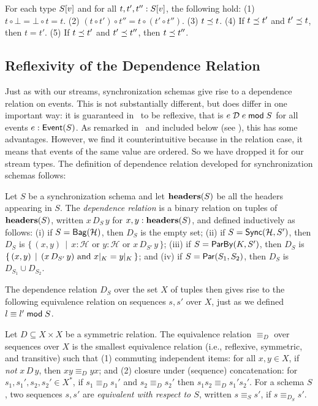 \begin{proposition}
\label{45:prop:sps-concat-properties}
For each type $\spstype{v}{S}$ and for all $t, t', t'': \spstype{v}{S}$,
the following hold:
(1) $t \circ \bot = \bot \circ t = t$.
(2) $(t \circ t') \circ t'' = t \circ (t' \circ t'')$.
(3) $t \prefix t$.
(4) If $t \prefix t'$ and $t' \prefix t$, then $t = t'$.
(5) If $t \prefix t'$ and $t' \prefix t''$, then $t \prefix t''$.
\end{proposition}

\subsection{Reflexivity of the Dependence Relation}

Just as with our streams, synchronization schemas give rise to a dependence relation on events.
This is not substantially different, but does differ in one important way: it is guaranteed in~ to be reflexive, that is $\deptype{e}{e}{S}$ for all events $\eventtype{e}{S}$.
As remarked in~ and included below (see ), this has some advantages.
However, we find it counterintuitive because in the relation case, it means that events of the same value are ordered. So we have dropped it for our stream types.
The definition of dependence relation developed for synchronization schemas follows:

\begin{definition}
\label{45:def:dep-relation}
Let $S$ be a synchronization schema and let $\headers(S)$ be all the headers appearing in $S$.
The \emph{dependence relation} is a binary relation on tuples of $\headers(S)$, written $x\, D_{S}\, y$ for $x, y: \headers(S)$, and defined inductively as follows:
(i) if $S = \relleaf{\mathcal{H}}$, then $D_{S}$ is the empty set;
(ii) if $S = \hier{\mathcal{H}}{S'}$, then
$D_{S}$ is $\{\, (x, y)\,\mid\,
    x : \mathcal{H}
    \text{ or } y : \mathcal{H}
    \text{ or } x\, D_{S'}\, y\,\}$;
(iii) if $S = \keyby{K}{S'}$, then
$D_{S}$ is $\{\, (x, y) \,\mid\,
    (x\, D_{S'}\, y) \text{ and } \tuprestrict{x}{K} = \tuprestrict{y}{K}\,\}$; and
(iv) if $S = \parcomp{S_1}{S_2}$, then
$D_{S}$ is $D_{S_1} \cup D_{S_2}$.
\end{definition}

The dependence relation $D_{S}$ over the set $X$ of tuples then gives rise to the following equivalence relation on sequences
$s, s'$ over $X$,
just as we defined $\equivtype{l}{l'}{S}$.
\begin{definition}
    Let $D \subseteq X \times X$ be a symmetric relation.
    The equivalence relation $\equiv_D$ over sequences over $X$ is
    the smallest equivalence relation (i.e., reflexive, symmetric, and transitive) such that (1)
    commuting independent items: for all $x, y \in X$, if \emph{not} $x\, D\, y$, then $x y \equiv_D y x$;
    and (2) closure under (sequence) concatenation: for $s_1, s_1', s_2, s_2' \in X^{*}$, if $s_1 \equiv_D s_1'$ and $s_2 \equiv_D s_2'$ then $s_1 s_2 \equiv_D s_1' s_2'$.
    For a schema $S$, two sequences $s, s'$ are \emph{equivalent with respect to $S$}, written $s \equiv_S s'$, if $s \equiv_{D_S} s'$.
    \end{definition}

